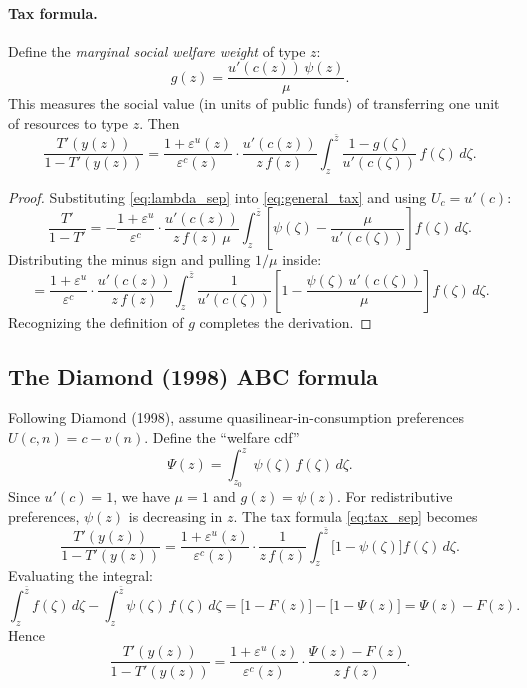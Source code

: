 \documentclass[12pt,a4paper]{article}
\theoremstyle{definition}
\theoremstyle{plain}
\theoremstyle{remark}
\newcommand{\zbar}{\bar{z}}
\newcommand{\zlow}{z_{\scriptscriptstyle 0}}
\begin{document}
\paragraph{Tax formula.} Define the \emph{marginal social welfare weight} of type $z$:
\begin{equation}
\label{eq:g_weight}
  g(z) = \frac{u'(c(z)) \, \psi(z)}{\mu}.
\end{equation}
This measures the social value (in units of public funds) of transferring one unit of resources to type $z$. Then
\begin{equation}
\label{eq:tax_sep}
  \frac{T'(y(z))}{1 - T'(y(z))}
  = \frac{1 + \varepsilon^u(z)}{\varepsilon^c(z)} \cdot \frac{u'(c(z))}{z \, f(z)}
    \int_{z}^{\zbar} \frac{1 - g(\zeta)}{u'(c(\zeta))} \, f(\zeta) \, d\zeta.
\end{equation}

\begin{proof}
Substituting \eqref{eq:lambda_sep} into \eqref{eq:general_tax} and using $U_c = u'(c)$:
\[
  \frac{T'}{1-T'} = -\frac{1+\varepsilon^u}{\varepsilon^c} \cdot \frac{u'(c(z))}{z \, f(z) \, \mu}
  \int_{z}^{\zbar} \left[ \psi(\zeta) - \frac{\mu}{u'(c(\zeta))} \right] f(\zeta) \, d\zeta.
\]
Distributing the minus sign and pulling $1/\mu$ inside:
\[
  = \frac{1+\varepsilon^u}{\varepsilon^c} \cdot \frac{u'(c(z))}{z \, f(z)}
  \int_{z}^{\zbar} \frac{1}{u'(c(\zeta))} \left[ 1 - \frac{\psi(\zeta) \, u'(c(\zeta))}{\mu} \right] f(\zeta) \, d\zeta.
\]
Recognizing the definition of $g$ completes the derivation.
\end{proof}

\subsection{The Diamond (1998) ABC formula}

Following Diamond (1998), assume quasilinear-in-consumption preferences $U(c,n) = c - v(n)$. Define the ``welfare cdf''
\[
  \Psi(z) = \int_{\zlow}^{z} \psi(\zeta) \, f(\zeta) \, d\zeta.
\]
Since $u'(c) = 1$, we have $\mu = 1$ and $g(z) = \psi(z)$. For redistributive preferences, $\psi(z)$ is decreasing in $z$. The tax formula \eqref{eq:tax_sep} becomes
\[
  \frac{T'(y(z))}{1 - T'(y(z))}
  = \frac{1+\varepsilon^u(z)}{\varepsilon^c(z)} \cdot \frac{1}{z \, f(z)}
  \int_{z}^{\zbar} \bigl[ 1 - \psi(\zeta) \bigr] f(\zeta) \, d\zeta.
\]
Evaluating the integral:
\[
  \int_{z}^{\zbar} f(\zeta) \, d\zeta - \int_{z}^{\zbar} \psi(\zeta) \, f(\zeta) \, d\zeta
  = \bigl[1 - F(z)\bigr] - \bigl[1 - \Psi(z)\bigr] = \Psi(z) - F(z).
\]
Hence
\begin{equation}
\label{eq:ABC_quasi}
  \frac{T'(y(z))}{1 - T'(y(z))} = \frac{1+\varepsilon^u(z)}{\varepsilon^c(z)} \cdot \frac{\Psi(z) - F(z)}{z \, f(z)}.
\end{equation}
\end{document}
